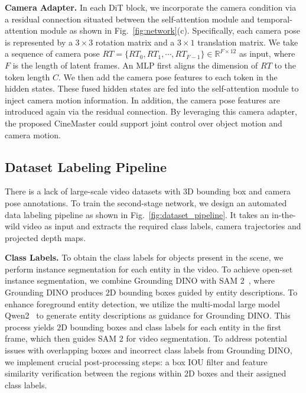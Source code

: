 \noindent\textbf{Camera Adapter.} In each DiT block, we incorporate the camera condition via a residual connection situated between the self-attention module and temporal-attention module as shown in Fig.~\ref{fig:network}(c). Specifically, each camera pose is represented by a $3\times 3$ rotation matrix and a $3\times 1$ translation matrix. We take a sequence of camera pose $RT=\{RT_0,RT_1,\cdots,RT_{F-1}\}\in\mathbb{R}^{F\times 12}$ as input, where $F$ is the length of latent frames. An MLP first aligns the dimension of $RT$ to the token length $C$. We then add the camera pose features to each token in the hidden states. These fused hidden states are fed into the self-attention module to inject camera motion information. In addition, the camera pose features are introduced again via the residual connection. By leveraging this camera adapter, the proposed CineMaster could support joint control over object motion and camera motion. 





\subsection{Dataset Labeling Pipeline}
\label{sec:dataset_labeling_pipeline}

There is a lack of large-scale video datasets with 3D bounding box and camera pose annotations. To train the second-stage network, we design an automated data labeling pipeline as shown in Fig.~\ref{fig:dataset_pipeline}. It takes an in-the-wild video as input and extracts the required class labels, camera trajectories and projected depth maps.

\noindent\textbf{Class Labels.} To obtain the class labels for objects present in the scene, we perform instance segmentation for each entity in the video. To achieve open-set instance segmentation, we combine Grounding DINO\cite{groundingdino} with SAM 2~\cite{2024sam2segmentimages}, where Grounding DINO produces $2$D bounding boxes guided by entity descriptions. To enhance foreground entity detection, we utilize the multi-modal large model Qwen2~\cite{qwen2} to generate entity descriptions as guidance for Grounding DINO. This process yields $2$D bounding boxes and class labels for each entity in the first frame, which then guides SAM 2 for video segmentation. To address potential issues with overlapping boxes and incorrect class labels from Grounding DINO, we implement crucial post-processing steps: a box IOU filter and feature similarity verification between the regions within $2$D boxes and their assigned class labels.

